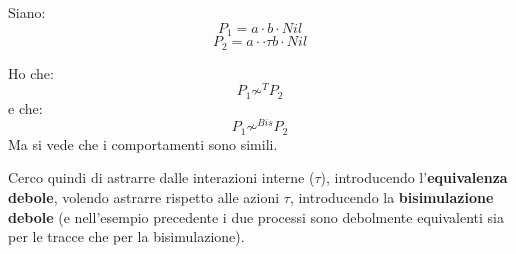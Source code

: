 \documentclass[a4paper,12pt, oneside]{book}
\begin{document}
\begin{esempio}
  Siano:
  \[P_1=a\cdot b\cdot Nil\]
  \[P_2=a\cdot \cdot \tau b\cdot Nil\]
   \begin{center}
  \end{center}
   \begin{center}
  \end{center}
  Ho che:
  \[P_1\not\sim^T P_2\]
  e che:
  \[P_1\not\sim^{Bis} P_2\]
  Ma si vede che i comportamenti sono simili.
  \label{debole}
\end{esempio}
Cerco quindi di astrarre dalle interazioni interne ($\tau$), introducendo
l'\textbf{equivalenza debole}, volendo astrarre rispetto alle azioni $\tau$,
introducendo la \textbf{bisimulazione debole} (e nell'esempio precedente i due
processi sono debolmente equivalenti sia per le tracce che per la
bisimulazione).
\end{document}
